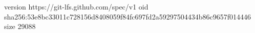 version https://git-lfs.github.com/spec/v1
oid sha256:53e8bc33011c728156d8408059f84fc697fd2a59297504434b86c9657f014446
size 29088
